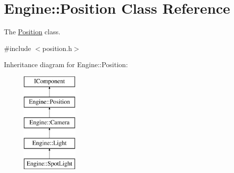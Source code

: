 \hypertarget{classEngine_1_1Position}{}\section{Engine\+:\+:Position Class Reference}
\label{classEngine_1_1Position}


The \hyperlink{classEngine_1_1Position}{Position} class.  




{\ttfamily \#include $<$position.\+h$>$}

Inheritance diagram for Engine\+:\+:Position\+:\begin{figure}[H]
\begin{center}
\leavevmode
\includegraphics[height=5.000000cm]{classEngine_1_1Position}
\end{center}
\end{figure}
